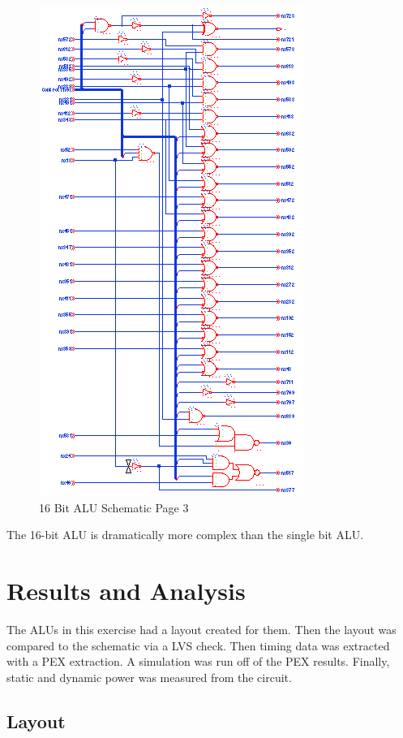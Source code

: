 \documentclass[11pt]{article}
\begin{document}
			\begin{figure}[H]
				\centering
				\includegraphics[width=0.4\linewidth]{"Pictures/ALU-16Bit Schematic 3"}
				\caption{16 Bit ALU Schematic Page 3}
				\label{fig:alu-16bit-schematic-3}
			\end{figure}

			The 16-bit ALU is dramatically more complex than the single bit ALU.

\section{Results and Analysis}
		
	The ALUs in this exercise had a layout created for them. Then the layout was compared to the schematic via a LVS check. Then timing data was extracted with a PEX extraction. A simulation was run off of the PEX results. Finally, static and dynamic power was measured from the circuit.
		
	\subsection{Layout}
		
\end{document}
